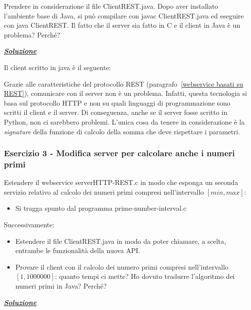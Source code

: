 \documentclass[a4paper]{article}
\begin{document}
	Prendere in considerazione il file \textsf{ClientREST.java}. Dopo aver installato l'ambiente base di Java, si può compilare con \textsf{javac ClientREST.java} ed eseguire con \textsf{java ClientREST}. Il fatto che il server sia fatto in C e il client in Java è un problema? Perché?\newline
	
	\noindent
	\textcolor{Green4}{\underline{\textbf{\emph{Soluzione}}}}\newline
	
	\noindent
	Il client scritto in java è il seguente:
	
	Grazie alle caratteristiche del protocollo REST (paragrafo~\ref{webservice basati su REST}), comunicare con il server non è un problema. Infatti, questa tecnologia si basa sul protocollo HTTP e non su quali linguaggi di programmazione sono scritti il client e il server. Di conseguenza, anche se il server fosse scritto in Python, non ci sarebbero problemi. L'unica cosa da tenere in considerazione è la \emph{signature} della funzione di calcolo della somma che deve rispettare i parametri.\newpage
	
	\subsubsection{Esercizio 3 - Modifica server per calcolare anche i numeri primi}\label{esercizio 3 - Modifica server per calcolare anche i numeri primi}
	
	Estendere il webservice \textsf{serverHTTP-REST.c} in modo che esponga un seconda servizio relativo al calcolo dei numeri primi compresi nell'intervallo $\left[min, max\right]$:
	\begin{itemize}
		\item Si tragga spunto dal programma \textsf{prime-number-interval.c}
	\end{itemize}
	Successivamente:
	\begin{itemize}
		\item Estendere il file \textsf{ClientREST.java} in modo da poter chiamare, a scelta, entrambe le funzionalità della nuova API.
		
		\item Provare il client con il calcolo dei numero primi compresi nell'intervallo $\left[1, 1000000\right]$: quanto tempi ci mette? Ho dovuto tradurre l'algoritmo dei numeri primi in Java? Perché?
	\end{itemize}
	
	\noindent
	\textcolor{Green4}{\underline{\textbf{\emph{Soluzione}}}}\newline
	
\end{document}
